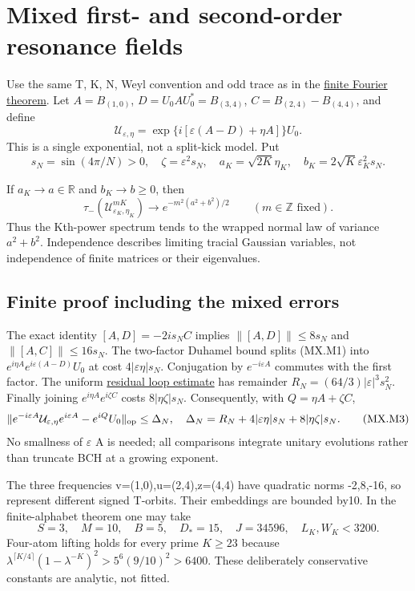 \section{Mixed first- and second-order resonance fields}\label{sec:mixed}
Use the same T, K, N, Weyl convention and odd trace as in the \hyperref[sec:finite_fourier]{finite Fourier theorem}. Let \(A=B_{(1,0)}\), \(D=U_0AU_0^*=B_{(3,4)}\), \(C=B_{(2,4)}-B_{(4,4)}\), and define \[
 \mathcal U_{\varepsilon,\eta}
   =\exp\{i[\varepsilon(A-D)+\eta A]\}U_0.                    \tag{MX.M1}
\] This is a single exponential, not a split-kick model. Put \[
 s_N=\sin(4\pi/N)>0,\quad \zeta=\varepsilon^2s_N,\quad
 a_K=\sqrt{2K}\eta_K,\quad b_K=2\sqrt K\varepsilon_K^2s_N.
\]
\begin{theorem}\label{pass1:mixed-1} If \(a_K\to a\in\mathbb R\) and \(b_K\to b\geq0\), then \[
 \boxed{\tau_-(\mathcal U_{\varepsilon_K,\eta_K}^{mK})
               \longrightarrow e^{-m^2(a^2+b^2)/2}}
 \qquad(m\in\mathbb Z\text{ fixed}).                         \tag{MX.M2}
\] Thus the Kth-power spectrum tends to the wrapped normal law of variance \(a^2+b^2\). Independence describes limiting tracial Gaussian variables, not independence of finite matrices or their eigenvalues.
\end{theorem}

\subsection{Finite proof including the mixed errors}\label{mixed:finite-proof-including-the-mixed-errors}

The exact identity \([A,D]=-2is_NC\) implies \(\|[A,D]\|\leq8s_N\) and \(\|[A,C]\|\leq16s_N\). The two-factor Duhamel bound splits (MX.M1) into \(e^{i\eta A}e^{i\varepsilon(A-D)}U_0\) at cost \(4|\varepsilon\eta|s_N\). Conjugation by \(e^{-i\varepsilon A}\) commutes with the first factor. The uniform \hyperref[sec:coboundary]{residual loop estimate} has remainder \(R_N=(64/3)|\varepsilon|^3s_N^2\). Finally joining \(e^{i\eta A}e^{i\zeta C}\) costs \(8|\eta\zeta|s_N\). Consequently, with \(Q=\eta A+\zeta C\), \[
 \|e^{-i\varepsilon A}\mathcal U_{\varepsilon,\eta}e^{i\varepsilon A}
                              -e^{iQ}U_0\|_{\rm op}\leq\Delta_N,
 \quad
 \Delta_N=R_N+4|\varepsilon\eta|s_N+8|\eta\zeta|s_N.           \tag{MX.M3}
\] No smallness of \(\varepsilon\) A is needed; all comparisons integrate unitary evolutions rather than truncate BCH at a growing exponent.

The three frequencies v=(1,0),u=(2,4),z=(4,4) have quadratic norms -2,8,-16, so represent different signed T-orbits. Their embeddings are bounded by10. In the finite-alphabet theorem one may take \[
 S=3,\quad M=10,\quad B=5,\quad D_*=15,\quad J=34596,
 \quad L_K,W_K<3200.
\] Four-atom lifting holds for every prime \(K\geq23\) because \(\lambda^{\lceil K/4\rceil}(1-\lambda^{-K})^2>5^6(9/10)^2>6400\). These deliberately conservative constants are analytic, not fitted.

